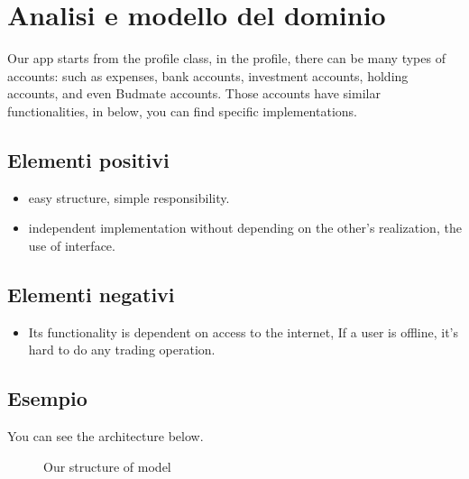 \documentclass[a4paper,12pt]{report}
\begin{document}
\section{Analisi e modello del dominio}
Our app starts from the profile class, in the profile, there can be many types of accounts: 
such as expenses, bank accounts, investment accounts, holding accounts, and even Budmate accounts. Those accounts have similar functionalities, in below, you can find specific implementations.

\subsection*{Elementi positivi}
\begin{itemize}
    \item easy structure, simple responsibility.
    \item independent implementation without depending on the other's realization, the use of interface.
\end{itemize}

\subsection*{Elementi negativi}
\begin{itemize}
    \item Its functionality is dependent on access to the internet, If a user is offline, it's hard to do any trading operation.
\end{itemize}

\subsection*{Esempio}
You can see the architecture below.

\begin{figure}[H]
\centering{}
%
\caption{Our structure of model}
\label{img:domainAnalysis}
\end{figure}
\end{document}
